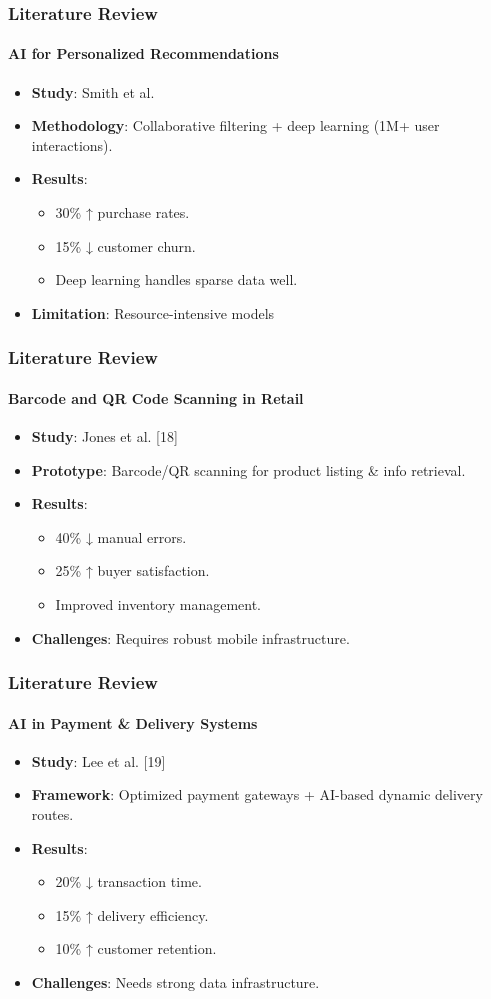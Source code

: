 \documentclass{beamer}
\begin{document}
\begin{frame}
	\frametitle{Literature Review}
	\framesubtitle{AI for Personalized Recommendations}
	\begin{itemize}
		\item \textbf{Study}: Smith et al.
		\item \textbf{Methodology}: Collaborative filtering + deep learning (1M+ user interactions).
		\item \textbf{Results}:
		      \begin{itemize}
			      \item 30\% ↑ purchase rates.
			      \item 15\% ↓ customer churn.
			      \item Deep learning handles sparse data well.
		      \end{itemize}
		\item \textbf{Limitation}: Resource-intensive models
	\end{itemize}
\end{frame}

\begin{frame}
	\frametitle{Literature Review}
	\framesubtitle{Barcode and QR Code Scanning in Retail}
	\begin{itemize}
		\item \textbf{Study}: Jones et al. [18]
		\item \textbf{Prototype}: Barcode/QR scanning for product listing \& info retrieval.
		\item \textbf{Results}:
		      \begin{itemize}
			      \item 40\% ↓ manual errors.
			      \item 25\% ↑ buyer satisfaction.
			      \item Improved inventory management.
		      \end{itemize}
		\item \textbf{Challenges}: Requires robust mobile infrastructure.
	\end{itemize}
\end{frame}

\begin{frame}
	\frametitle{Literature Review}
	\framesubtitle{AI in Payment \& Delivery Systems}
	\begin{itemize}
		\item \textbf{Study}: Lee et al. [19]
		\item \textbf{Framework}: Optimized payment gateways + AI-based dynamic delivery routes.
		\item \textbf{Results}:
		      \begin{itemize}
			      \item 20\% ↓ transaction time.
			      \item 15\% ↑ delivery efficiency.
			      \item 10\% ↑ customer retention.
		      \end{itemize}
		\item \textbf{Challenges}: Needs strong data infrastructure.
	\end{itemize}
\end{frame}
\end{document}
